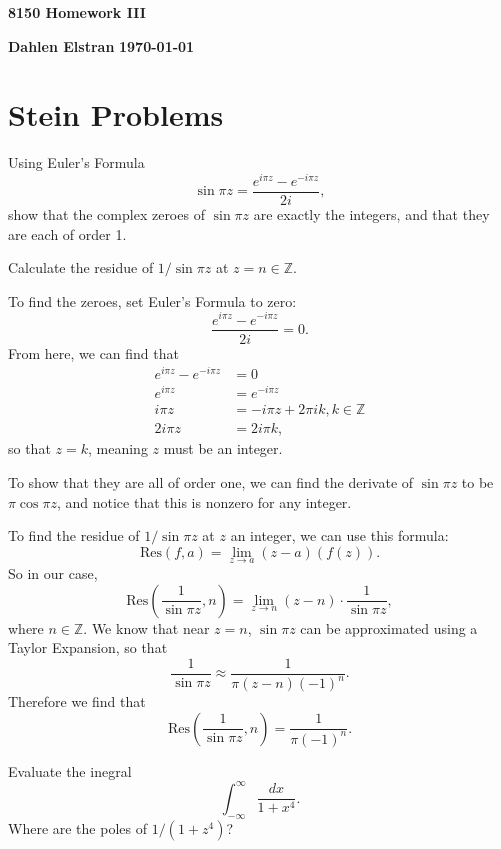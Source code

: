 \documentclass[12pt]{article}
\begin{document}
\begin{newtitle}
  \begin{center}
    \textbf{\Huge 8150 Homework III}
  \end{center}
  \textbf{Dahlen Elstran} \hfill \textbf{\today}
\end{newtitle}

\section*{Stein Problems}

\begin{statement}
  Using Euler's Formula
  $$ \sin \pi z = \frac{e^{i \pi z}-e^{-i \pi z}}{2i}, $$
  show that the complex zeroes of $\sin \pi z$ are exactly the integers, and that they are each of order 1. 
  \par Calculate the residue of $1/\sin \pi z$ at $z=n \in \mathbb{Z}$. 
\end{statement}
\begin{newproof}
  To find the zeroes, set Euler's Formula to zero:
  $$ \frac{e^{i \pi z}-e^{-i \pi z}}{2i} = 0. $$
  From here, we can find that 
  \begin{align*}
    e^{i \pi z} - e^{-i \pi z} &= 0 \\
    e^{i \pi z} &= e^{-i \pi z} \\ 
    i \pi z &= -i \pi z + 2 \pi i k , k \in \mathbb{Z} \\
    2i \pi z &= 2 i \pi k,
  \end{align*}
  so that $z = k$, meaning $z$ must be an integer. 
  \par To show that they are all of order one, we can find the derivate of $\sin \pi z$ to be 
  $ \pi \cos \pi z$, and notice that this is nonzero for any integer. 
  \par To find the residue of $1 / \sin \pi z$ at $z$ an integer, we can use this formula:
  $$ \text{Res}(f,a)=\lim_{z \to a} (z-a)(f(z)). $$
  So in our case, 
  $$ \text{Res}(\frac{1}{\sin \pi z}, n) = \lim_{z \to n} (z-n) \cdot \frac{1}{\sin \pi z}, $$
  where $n \in \mathbb{Z}$. 
  We know that near $z=n$, $\sin \pi z$ can be approximated using a Taylor Expansion, so that 
  $$ \frac{1}{\sin \pi z} \approx \frac{1}{\pi (z-n)(-1)^n}. $$
  Therefore we find that 
  $$ \text{Res}(\frac{1}{\sin \pi z}, n ) = \frac{1}{\pi (-1)^n}. $$
\end{newproof}

\begin{statement}
  Evaluate the inegral 
  $$ \int^{\infty}_{-\infty} \frac{dx}{1+x^4}. $$
  Where are the poles of $1/(1+z^4)$?
\end{statement}
\begin{newproof}
  
\end{newproof}
\end{document}
